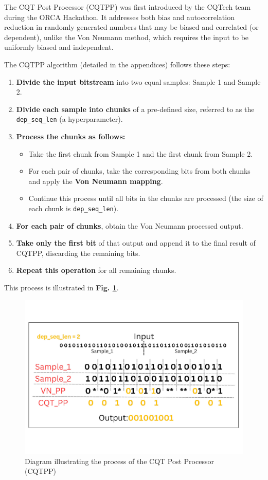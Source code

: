 The CQT Post Processor (CQTPP) was first introduced by the CQTech team during the ORCA Hackathon. It addresses both bias and autocorrelation reduction in randomly generated numbers that may be biased and correlated (or dependent), unlike the Von Neumann method, which requires the input to be uniformly biased and independent.

The CQTPP algorithm (detailed in the appendices) follows these steps:

\begin{enumerate}
    \item \textbf{Divide the input bitstream} into two equal samples: Sample 1 and Sample 2.
    \item \textbf{Divide each sample into chunks} of a pre-defined size, referred to as the \texttt{dep\_seq\_len} (a hyperparameter).
    \item \textbf{Process the chunks as follows:}
    \begin{itemize}
        \item Take the first chunk from Sample 1 and the first chunk from Sample 2.
        \item For each pair of chunks, take the corresponding bits from both chunks and apply the \textbf{Von Neumann mapping}.
        \item Continue this process until all bits in the chunks are processed (the size of each chunk is \texttt{dep\_seq\_len}).
    \end{itemize}
    \item \textbf{For each pair of chunks}, obtain the Von Neumann processed output.
    \item \textbf{Take only the first bit} of that output and append it to the final result of CQTPP, discarding the remaining bits.
    \item \textbf{Repeat this operation} for all remaining chunks.
\end{enumerate}

This process is illustrated in \textbf{Fig. \ref{fig:CQTPP_process}}.

\begin{figure}[h]
\centering
\includegraphics[width=12cm]{figures/CQTPP.pdf}
\caption{Diagram illustrating the process of the CQT Post Processor (CQTPP)}
\label{fig:CQTPP_process}
\end{figure}

